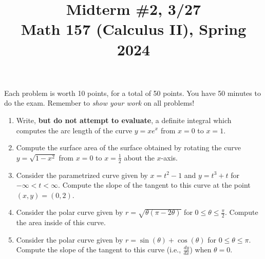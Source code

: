 \documentclass[11pt]{article}
\title{Midterm \#2, 3/27 \\ Math 157 (Calculus II), Spring 2024}
\date{}
\begin{document}
\maketitle

\thispagestyle{empty}

\vspace{-1cm}

Each problem is worth 10 points, for a total of 50 points. You have 50 minutes to do the exam. Remember to \emph{show your work} on all problems!

\begin{enumerate}
\item Write, {\bf but do not attempt to evaluate}, a definite integral which computes the arc length of the curve $y=xe^{x}$ from $x=0$ to $x=1$.
\item Compute the surface area of the surface obtained by rotating the curve $y=\sqrt{1-x^2}$ from $x=0$ to $x=\frac{1}{2}$ about the $x$-axis.
\item Consider the parametrized curve given by $x=t^2-1$ and $y=t^3+t$ for $-\infty < t < \infty$. Compute the slope of the tangent to this curve at the point $(x,y)=(0,2)$.
\item Consider the polar curve given by $r=\sqrt{\theta (\pi-2\theta)}$ for $0 \leq \theta \leq \frac{\pi}{2}$. Compute the area inside of this curve.
\item Consider the polar curve given by $r=\sin(\theta)+\cos(\theta)$ for $0 \leq \theta \leq \pi$. Compute the slope of the tangent to this curve (i.e., $\frac{dy}{dx}$) when $\theta=0$.
\end{enumerate}
\end{document}
